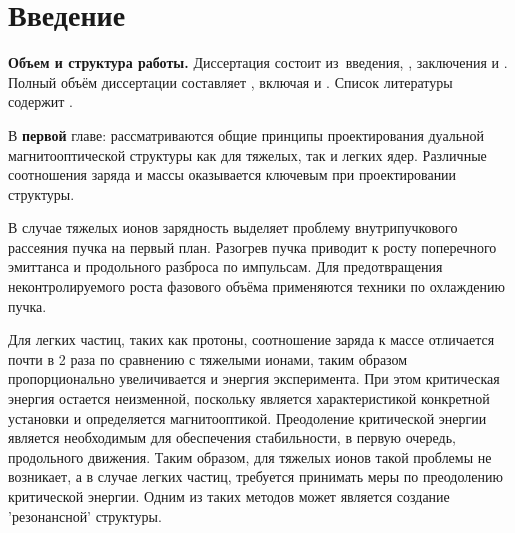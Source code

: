 \chapter*{Введение}                         %

\newcommand{\actuality}{}
\newcommand{\progress}{}
\newcommand{\aim}{{\textbf\aimTXT}}
\newcommand{\tasks}{\textbf{\tasksTXT}}
\newcommand{\novelty}{\textbf{\noveltyTXT}}
\newcommand{\influence}{\textbf{\influenceTXT}}
\newcommand{\methods}{\textbf{\methodsTXT}}
\newcommand{\defpositions}{\textbf{\defpositionsTXT}}
\newcommand{\reliability}{\textbf{\reliabilityTXT}}
\newcommand{\probation}{\textbf{\probationTXT}}
\newcommand{\contribution}{\textbf{\contributionTXT}}
\newcommand{\publications}{\textbf{\publicationsTXT}}


\textbf{Объем и структура работы.} Диссертация состоит из~введения,
,
заключения и
.
%
Полный объём диссертации составляет
, включая
 и
.
Список литературы содержит
.

В \textbf{первой} главе: рассматриваются общие принципы проектирования дуальной магнитооптической структуры как для тяжелых, так и легких ядер. Различные соотношения заряда и массы оказывается ключевым при проектировании структуры. 
\par В случае тяжелых ионов зарядность выделяет проблему внутрипучкового рассеяния пучка на первый план. Разогрев пучка приводит к росту поперечного эмиттанса и продольного разброса по импульсам. Для предотвращения неконтролируемого роста фазового объёма применяются техники по охлаждению пучка.
\par Для легких частиц, таких как протоны, соотношение заряда к массе отличается почти в 2 раза по сравнению с тяжелыми ионами, таким образом пропорционально увеличивается и энергия эксперимента. При этом критическая энергия остается неизменной, поскольку является характеристикой конкретной установки и определяется магнитооптикой. Преодоление критической энергии является необходимым для обеспечения стабильности, в первую очередь, продольного движения. Таким образом, для тяжелых ионов такой проблемы не возникает, а в случае легких частиц, требуется принимать меры по преодолению критической энергии. Одним из таких методов может является создание 'резонансной' структуры. 

